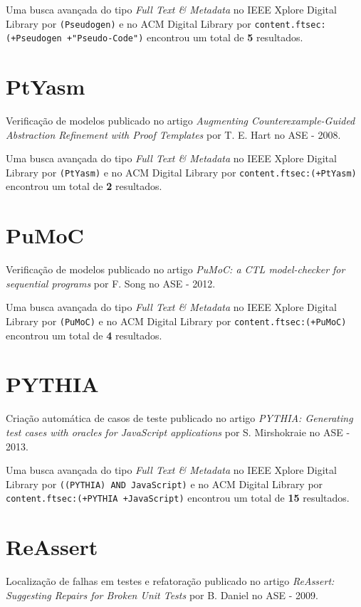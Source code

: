 Uma busca avançada do tipo {\it Full Text \& Metadata} no IEEE Xplore Digital Library por
\texttt{(Pseudogen)}
e no ACM Digital Library por
\texttt{content.ftsec:(+Pseudogen +"Pseudo-Code")}
encontrou um total de
{\bf 5}
resultados.

\section{PtYasm}

Verificação de modelos
publicado no artigo
{\it Augmenting Counterexample-Guided Abstraction Refinement with Proof Templates}
por
T. E. Hart
no
ASE
-
2008.


Uma busca avançada do tipo {\it Full Text \& Metadata} no IEEE Xplore Digital Library por
\texttt{(PtYasm)}
e no ACM Digital Library por
\texttt{content.ftsec:(+PtYasm)}
encontrou um total de
{\bf 2}
resultados.

\section{PuMoC}

Verificação de modelos
publicado no artigo
{\it PuMoC: a CTL model-checker for sequential programs}
por
F. Song
no
ASE
-
2012.


Uma busca avançada do tipo {\it Full Text \& Metadata} no IEEE Xplore Digital Library por
\texttt{(PuMoC)}
e no ACM Digital Library por
\texttt{content.ftsec:(+PuMoC)}
encontrou um total de
{\bf 4}
resultados.

\section{PYTHIA}

Criação automática de casos de teste
publicado no artigo
{\it PYTHIA: Generating test cases with oracles for JavaScript applications}
por
S. Mirshokraie
no
ASE
-
2013.


Uma busca avançada do tipo {\it Full Text \& Metadata} no IEEE Xplore Digital Library por
\texttt{((PYTHIA) AND JavaScript)}
e no ACM Digital Library por
\texttt{content.ftsec:(+PYTHIA +JavaScript)}
encontrou um total de
{\bf 15}
resultados.

\section{ReAssert}

Localização de falhas em testes e refatoração
publicado no artigo
{\it ReAssert: Suggesting Repairs for Broken Unit Tests}
por
B. Daniel
no
ASE
-
2009.



